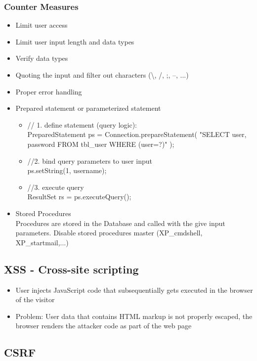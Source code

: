 \documentclass[a4paper, 12pt]{article}
\begin{document}
\subsubsection{Counter Measures}
\begin{itemize}
\item Limit user access
\item Limit user input length and data types
\item Verify data types
\item Quoting the input and filter out characters (\textbackslash, /, ;, --, ...)
\item Proper error handling
\item Prepared statement or parameterized statement \\
\begin{itemize}
\item // 1. define statement (query logic): \\
PreparedStatement ps = Connection.prepareStatement(
"SELECT user, password FROM tbl\_user WHERE (user=?)"
);
\item //2. bind query parameters to user input \\
ps.setString(1, username);
\item //3. execute query \\
ResultSet rs = ps.executeQuery();
\end{itemize}
\item Stored Procedures \\
Procedures are stored in the Database and called with the give input parameters.
Disable stored procedures master (XP\_cmdshell, XP\_startmail,...)
\end{itemize}

\subsection{XSS - Cross-site scripting}
\begin{itemize}
\item User injects JavaScript code that subsequentially gets executed in the browser of the visitor
\item Problem: User data that contains HTML markup is not properly escaped, the browser renders the attacker code as part of the web page
\end{itemize}

\subsection{CSRF}
\end{document}
